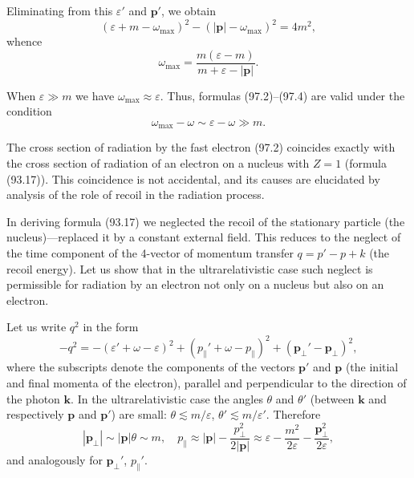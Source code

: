 
Eliminating from this $\varepsilon'$ and $\mathbf{p}'$, we obtain
\[
(\varepsilon + m - \omega_\text{max})^2 - (|\mathbf{p}| - \omega_\text{max})^2 = 4m^2,
\]
whence
\begin{equation}
\omega_\text{max} = \frac{m(\varepsilon - m)}{m + \varepsilon - |\mathbf{p}|}.
\label{eq:97.6}
\end{equation}

When $\varepsilon \gg m$ we have $\omega_\text{max} \approx \varepsilon$. Thus, formulas (97.2)--(97.4) are valid under the condition
\begin{equation}
\omega_\text{max} - \omega \sim \varepsilon - \omega \gg m.
\label{eq:97.7}
\end{equation}

The cross section of radiation by the fast electron (97.2) coincides exactly with the cross section of radiation of an electron on a nucleus with $Z = 1$ (formula (93.17)). This coincidence is not accidental, and its causes are elucidated by analysis of the role of recoil in the radiation process.

In deriving formula (93.17) we neglected the recoil of the stationary particle (the nucleus)---replaced it by a constant external field. This reduces to the neglect of the time component of the 4-vector of momentum transfer $q = p' - p + k$ (the recoil energy). Let us show that in the ultrarelativistic case such neglect is permissible for radiation by an electron not only on a nucleus but also on an electron.

Let us write $q^2$ in the form
\begin{equation}
-q^2 = -(\varepsilon' + \omega - \varepsilon)^2 + (p_\parallel' + \omega - p_\parallel)^2 + (\mathbf{p}_\perp' - \mathbf{p}_\perp)^2,
\label{eq:97.8}
\end{equation}
where the subscripts denote the components of the vectors $\mathbf{p}'$ and $\mathbf{p}$ (the initial and final momenta of the electron), parallel and perpendicular to the direction of the photon $\mathbf{k}$. In the ultrarelativistic case the angles $\theta$ and $\theta'$ (between $\mathbf{k}$ and respectively $\mathbf{p}$ and $\mathbf{p}'$) are small: $\theta \lesssim m/\varepsilon$, $\theta' \lesssim m/\varepsilon'$. Therefore
\begin{equation}
|\mathbf{p}_\perp| \sim |\mathbf{p}|\theta \sim m, \quad p_\parallel \approx |\mathbf{p}| - \frac{p_\perp^2}{2|\mathbf{p}|} \approx \varepsilon - \frac{m^2}{2\varepsilon} - \frac{\mathbf{p}_\perp^2}{2\varepsilon},
\label{eq:97.9}
\end{equation}
and analogously for $\mathbf{p}_\perp'$, $p_\parallel'$.

